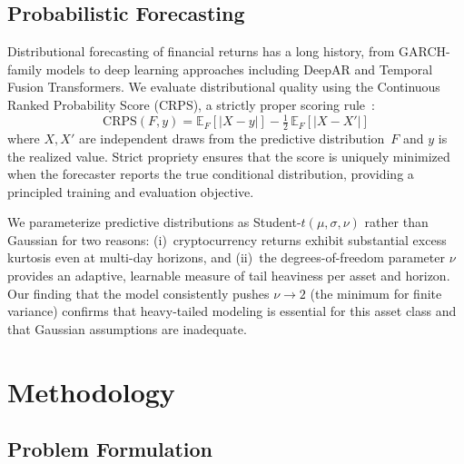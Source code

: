 \documentclass[sigconf]{acmart}
\begin{document}
\subsection{Probabilistic Forecasting}

Distributional forecasting of financial returns has a long history, from GARCH-family models to deep learning approaches including DeepAR and Temporal Fusion Transformers.
We evaluate distributional quality using the Continuous Ranked Probability Score (CRPS), a strictly proper scoring rule~\cite{gneiting2007}:
\begin{equation}
\text{CRPS}(F, y) = \mathbb{E}_F\!\left[|X - y|\right] - \tfrac{1}{2}\,\mathbb{E}_F\!\left[|X - X'|\right]
\label{eq:crps}
\end{equation}
where $X, X'$ are independent draws from the predictive distribution~$F$ and $y$ is the realized value.
Strict propriety ensures that the score is uniquely minimized when the forecaster reports the true conditional distribution, providing a principled training and evaluation objective.

We parameterize predictive distributions as Student-$t(\mu, \sigma, \nu)$ rather than Gaussian for two reasons: (i)~cryptocurrency returns exhibit substantial excess kurtosis even at multi-day horizons, and (ii)~the degrees-of-freedom parameter $\nu$ provides an adaptive, learnable measure of tail heaviness per asset and horizon.
Our finding that the model consistently pushes $\nu \to 2$ (the minimum for finite variance) confirms that heavy-tailed modeling is essential for this asset class and that Gaussian assumptions are inadequate.

%

\section{Methodology}

\subsection{Problem Formulation}
\end{document}
